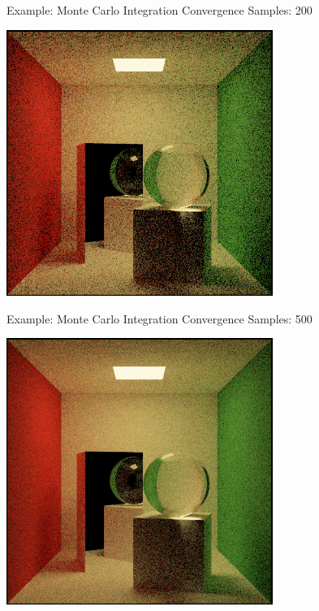 \documentclass{beamer}
\begin{document}
\begin{frame}{Example: Monte Carlo Integration Convergence}
    Samples: 200
    \begin{center}
        \includegraphics[width=0.65\textwidth]{../img/convergence/cornell-00200.png}
    \end{center}
\end{frame}

\begin{frame}{Example: Monte Carlo Integration Convergence}
    Samples: 500
    \begin{center}
        \includegraphics[width=0.65\textwidth]{../img/convergence/cornell-00500.png}
    \end{center}
\end{frame}
\end{document}
